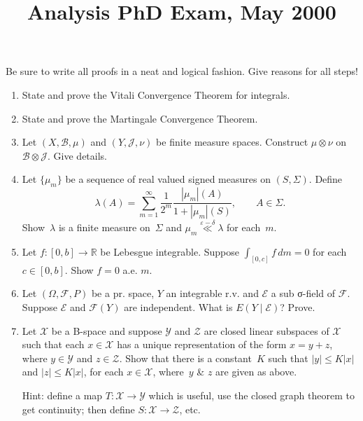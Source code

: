 \documentclass[11pt,letterpaper]{article}
\title{Analysis PhD Exam, May 2000}
\author{}
\date{}
\newenvironment{examproblems}[2]{%
  \def\ProblemHeadingTag{#2}%
  \AssignTaggingSocketPlug{block/list/label}{examproblem}%
  \begin{enumerate}%
  \setcounter{enumi}{#1}%
  \renewcommand{\labelenumi}{\textbf{\theenumi.}}%
  \setlength{\topsep}{0.35em}%
  \setlength{\partopsep}{0pt}%
  \setlength{\itemsep}{0.48em}%
  \setlength{\parsep}{0.18em}%
}{\end{enumerate}}
\newenvironment{examinstructions}{%
  \par\begingroup\itshape
}{%
  \par\endgroup\vspace{0.18em}
}
\begin{document}
\maketitle
\thispagestyle{empty}
\begin{examinstructions}
Be sure to write all proofs in a neat and logical fashion. Give reasons for all steps!
\end{examinstructions}
\begin{examproblems}{0}{H2}
\def\ProblemHeadingText{Problem 1.}
\item
State and prove the Vitali Convergence Theorem for integrals.
\def\ProblemHeadingText{Problem 2.}
\item
State and prove the Martingale Convergence Theorem.
\def\ProblemHeadingText{Problem 3.}
\item
Let \((X,\mathcal B,\mu)\) and \((Y,\mathcal J,\nu)\) be finite measure spaces. Construct \(\mu\otimes\nu\) on \(\mathcal B\otimes\mathcal J\). Give details.
\def\ProblemHeadingText{Problem 4.}
\item
Let \(\{\mu_m\}\) be a sequence of real valued signed measures on \((S,\Sigma)\). Define
\[
\lambda(A)=\sum_{m=1}^{\infty}\frac{1}{2^m}\frac{|\mu_m|(A)}{1+|\mu_m|(S)},\qquad A\in\Sigma.
\]
 Show~\(\lambda\) is a finite measure on~\(\Sigma\) and \(\mu_m\overset{\varepsilon-\delta}{\ll}\lambda\) for each~\(m\).
\def\ProblemHeadingText{Problem 5.}
\item
Let \(f:[0,b]\to\mathbb R\) be Lebesgue integrable. Suppose \(\int_{[0,c]}f\,dm=0\) for each \(c\in[0,b]\). Show \(f=0\) a.e. \(m\).
\def\ProblemHeadingText{Problem 6.}
\item
Let \((\Omega,\mathcal F,P)\) be a pr. space, \(Y\) an integrable r.v. and \(\mathcal E\) a sub σ-field of \(\mathcal F\). Suppose \(\mathcal E\) and \(\mathcal F(Y)\) are independent. What is \(E(Y\mid\mathcal E)\)? Prove.
\def\ProblemHeadingText{Problem 7.}
\item
Let \(\mathcal X\) be a B-space and suppose \(\mathcal Y\) and \(\mathcal Z\) are closed linear subspaces of \(\mathcal X\) such that each \(x\in\mathcal X\) has a unique representation of the form \(x=y+z\), where \(y\in\mathcal Y\) and \(z\in\mathcal Z\). Show that there is a constant~\(K\) such that \(|y|\le K|x|\) and \(|z|\le K|x|\), for each \(x\in\mathcal X\), where~\(y\) \& \(z\) are given as above.

\par
Hint: define a map \(T:\mathcal X\to\mathcal Y\) which is useful, use the closed graph theorem to get continuity; then define \(S:\mathcal X\to\mathcal Z\), etc.
\end{examproblems}
\end{document}

